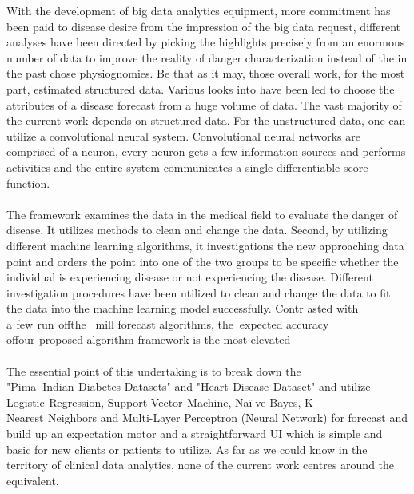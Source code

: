 \documentclass[oneside,12pt]{Classes/VTU}
\begin{document}
    \begin{singlespacing}
   	With the development of big data analytics equipment, more commitment has been paid to disease desire from the impression of the big data request, different analyses have been directed by picking the highlights precisely from an enormous number of data to improve the reality of danger characterization instead of the in the past chose physiognomies. Be that as it may, those overall work, for the most part, estimated structured data. Various looks into have been led to choose the attributes of a disease forecast from a huge volume of data. The vast majority of the current work depends on structured data. For the unstructured data, one can utilize a convolutional neural system. Convolutional neural networks are comprised of a neuron, every neuron gets a few information sources and performs activities and the entire system communicates a single differentiable score function.
   	\paragraph{}
   	The framework examines the data in the medical field to evaluate the danger of disease. It utilizes methods to clean and change the data. Second, by utilizing different machine learning algorithms, it investigations the new approaching data point and orders the point into one of the two groups to be specific whether the individual is experiencing disease or not experiencing the disease. Different investigation procedures have been utilized to clean and change the data to fit the data into the machine learning model successfully. Contr\tiny\textcolor{white}{ }\normalsize asted with a\tiny\textcolor{white}{t}\normalsize few\tiny\textcolor{white}{s}\normalsize run\tiny\textcolor{white}{s}\normalsize of\tiny\textcolor{white}{f}\normalsize the\tiny\textcolor{white}{m}\normalsize mill forecast algorithms, the\tiny\textcolor{white}{n}\normalsize expected accuracy of\tiny\textcolor{white}{f}\normalsize our\tiny\textcolor{white}{s}\normalsize proposed algorithm framework is the most elevated
   	\paragraph{}
	The essential point of this undertaking is to break down the "Pima\tiny\textcolor{white}{n}\normalsize Indian\tiny\textcolor{white}{s}\normalsize Diabetes Datasets" and "Heart\tiny\textcolor{white}{s}\normalsize Disease\tiny\textcolor{white}{s}\normalsize Dataset" and utilize Logistic\tiny\textcolor{white}{s}\normalsize Regression, Support Vector\tiny\textcolor{white}{s}\normalsize Machine, Naï\tiny\textcolor{white}{i}\normalsize ve Bayes, K\tiny\textcolor{white}{n}\normalsize-Nearest\tiny\textcolor{white}{s}\normalsize Neighbors and Multi-Layer Perceptron (Neural Network) for forecast and build up an expectation motor and a straightforward UI which is simple and basic for new clients or patients to utilize. As far as we could know in the territory of clinical data analytics, none of the current work centres around the equivalent.
	
    \end{singlespacing}
    	
\end{document}
